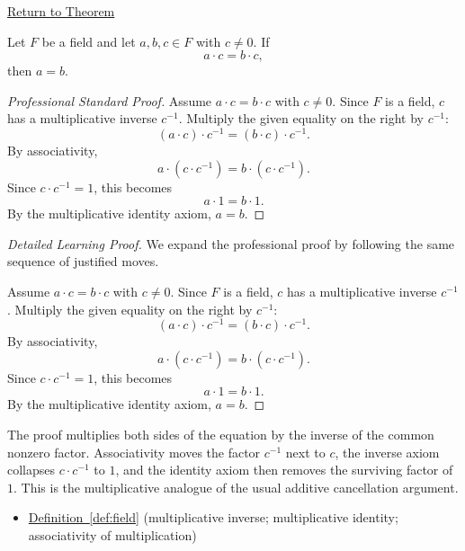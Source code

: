 \newpage
{}
\label{prf:multiplicative-cancellation}

\begin{remark*}[Return]
\hyperref[thm:multiplicative-cancellation]{Return to Theorem}
\end{remark*}

\begin{theorem*}
Let $F$ be a field and let $a,b,c\in F$ with $c\neq 0$.  If
\[
a\cdot c = b\cdot c,
\]
then $a = b$.
\end{theorem*}

\begin{proof}[Professional Standard Proof]
\LRAProofBodyStart
Assume $a\cdot c=b\cdot c$ with $c\neq 0$.  Since $F$ is a field, $c$ has a
multiplicative inverse $c^{-1}$.  Multiply the given equality on the right by
$c^{-1}$:
\[
(a\cdot c)\cdot c^{-1}=(b\cdot c)\cdot c^{-1}.
\]
By associativity,
\[
a\cdot(c\cdot c^{-1})=b\cdot(c\cdot c^{-1}).
\]
Since $c\cdot c^{-1}=1$, this becomes
\[
a\cdot 1=b\cdot 1.
\]
By the multiplicative identity axiom, $a=b$.
\end{proof}

\begin{proof}[Detailed Learning Proof]
\LRAProofBodyStart
We expand the professional proof by following the same sequence of justified moves.

Assume $a\cdot c=b\cdot c$ with $c\neq 0$.  Since $F$ is a field, $c$ has a
multiplicative inverse $c^{-1}$.  Multiply the given equality on the right by
$c^{-1}$:
\[
(a\cdot c)\cdot c^{-1}=(b\cdot c)\cdot c^{-1}.
\]
By associativity,
\[
a\cdot(c\cdot c^{-1})=b\cdot(c\cdot c^{-1}).
\]
Since $c\cdot c^{-1}=1$, this becomes
\[
a\cdot 1=b\cdot 1.
\]
By the multiplicative identity axiom, $a=b$.
\end{proof}

\begin{remark*}
The proof multiplies both sides of the equation by the inverse of the common
nonzero factor.  Associativity moves the factor $c^{-1}$ next to $c$, the
inverse axiom collapses $c\cdot c^{-1}$ to $1$, and the identity axiom then
removes the surviving factor of $1$.  This is the multiplicative analogue of
the usual additive cancellation argument.
\end{remark*}

\begin{dependencies}
\begin{itemize}
  \item \hyperref[def:field]{Definition~\ref*{def:field}}
        \textnormal{(multiplicative inverse; multiplicative identity; associativity of multiplication)}
\end{itemize}
\end{dependencies}

\clearpage
